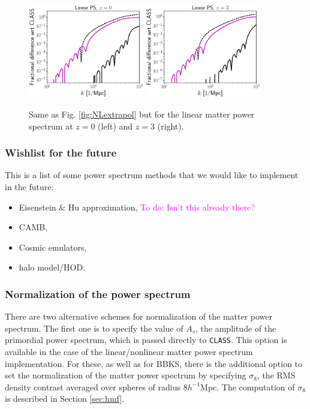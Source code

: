 \documentclass[\docopts]{\docclass}
\newcommand{\todo}[1]{\textcolor{magenta}{To do: #1}}
\begin{document}
\begin{figure}
\centering
\includegraphics[width=0.45\textwidth]{PS_converge_linear.eps}
\includegraphics[width=0.45\textwidth]{PS_converge_linear_z3.eps}
\caption{Same as Fig. \ref{fig:NLextrapol} but for the linear matter power spectrum at $z=0$ (left) and $z=3$ (right).}
\label{fig:Lextrapol}
\end{figure}

\subsubsection{Wishlist for the future}
\label{Pk_whishlist}
This is a list of some power spectrum methods that we would like to implement in the future:
\begin{itemize}
 \item Eisenstein \& Hu approximation, \todo{Isn't this already there?}
 \item CAMB,
 \item Cosmic emulators,
 \item halo model/HOD.
\end{itemize}


\subsubsection{Normalization of the power spectrum}
\label{sec:PSnorm}

There are two alternative schemes for normalization of the matter power spectrum. The first one is to specify the value of $A_s$, the amplitude of the primordial power spectrum, which is passed directly to {\tt CLASS}. This option is available in the case of the linear/nonlinear matter power spectrum implementation. For these, as well as for BBKS, there is the additional option to set the normalization of the matter power spectrum by specifying $\sigma_8$, the RMS density contrast averaged over spheres of radius $8h^{-1}$Mpc. The computation of $\sigma_8$ is described in Section \ref{sec:hmf}.
\end{document}
